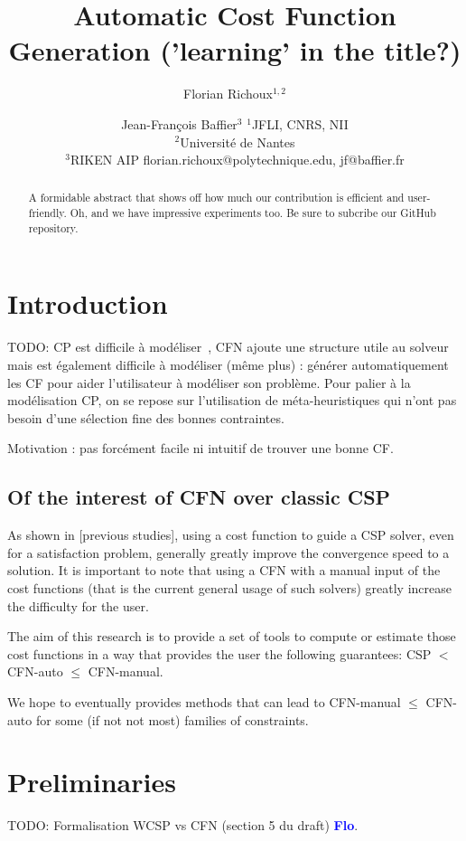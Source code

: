 \documentclass{article}
\title{Automatic Cost Function Generation ('learning' in the title?)}
\author{
Florian Richoux$^{1,2}$
\and
Jean-François Baffier$^3$
\affiliations
$^1$JFLI, CNRS, NII\\
$^2$Université de Nantes\\
$^3$RIKEN AIP
\emails
florian.richoux@polytechnique.edu,
jf@baffier.fr
}
\newcommand{\cfn}{\textsc{CFN}\xspace}
\newcommand{\flo}{\textcolor{blue}{\bf Flo}\xspace}
\begin{document}
\maketitle

\begin{abstract}
  A formidable  abstract that shows  off how much our  contribution is
  efficient and user-friendly. Oh,  and we have impressive experiments
  too. Be sure to subcribe our GitHub repository.
\end{abstract}

\section{Introduction}\label{sec:introduction}

TODO: CP  est difficile à  modéliser~\cite{Puget2004,Wallace2003}, CFN
ajoute une structure  utile au solveur mais est  également difficile à
modéliser  (même plus)  : générer  automatiquement les  CF pour  aider
l'utilisateur à modéliser son problème.  Pour palier à la modélisation
CP, on se repose sur  l'utilisation de méta-heuristiques qui n'ont pas
besoin       d'une        sélection       fine        des       bonnes
contraintes. \cite{AMJFH2011,Bessiere2015,CBLS}

Motivation : pas forcément facile ni intuitif de trouver une bonne CF.


\subsection{Of the interest of \cfn over classic CSP}
As shown in  [previous studies], using a cost function  to guide a CSP
solver, even for a satisfaction problem, generally greatly improve the
convergence speed to a solution.  It is important to note that using a
\cfn with  a manual input of  the cost functions (that  is the current
general usage of such solvers) greatly increase the difficulty for the
user.

The aim of  this research is to  provide a set of tools  to compute or
estimate those  cost functions  in a  way that  provides the  user the
following guarantees: CSP $<$ CFN-auto $\leq$ CFN-manual.

We hope  to eventually  provides methods that  can lead  to CFN-manual
$\leq$ CFN-auto for some (if not not most) families of constraints.

\section{Preliminaries}\label{sec:preliminaries}
TODO: Formalisation    WCSP     vs    CFN     (section    5     du
draft) \flo. \cite{Bessiere2011,LK2014}
\end{document}
